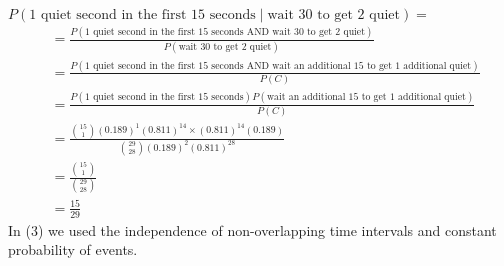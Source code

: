 $ P(\text{1 quiet second in the first 15 seconds}\mid\text{wait 30 to get 2 quiet})= $
\begin{align}
    &=\frac{P(\text{1 quiet second in the first 15 seconds}\text{ AND wait 30 to get 2 quiet})}{P(\text{wait 30 to get 2 quiet})}\\
    &=\frac{P(\text{1 quiet second in the first 15 seconds} \text{ AND wait an additional 15 to get 1 additional quiet})}{P(C)} \\
    &=\frac{P(\text{1 quiet second in the first 15 seconds})P(\text{wait an additional 15 to get 1 additional quiet}) }{P(C)}\\
    &=\frac{\binom{15}{1}(0.189)^1(0.811)^{14}\times (0.811)^{14}(0.189)}
    {\binom{29}{28}(0.189)^2(0.811)^{28}}\\
    &=\frac{\binom{15}{1}}{\binom{29}{28}}\\
    &=\frac{15}{29} 
\end{align}
In (3) we used the independence of non-overlapping time intervals and constant
probability of events.

